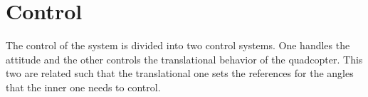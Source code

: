\section{Control}
The control of the system is divided into two control systems. One handles the attitude and the other controls the translational behavior of the quadcopter. This two are related such that the translational one sets the references for the angles that the inner one needs to control.